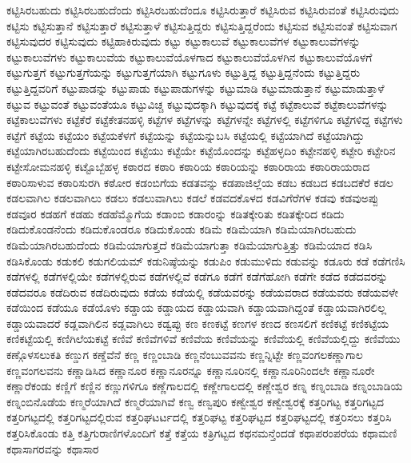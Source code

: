 {ಕಟ್ಟಿಸಿರಬಹುದು
ಕಟ್ಟಿಸಿರಬಹುದೆಂದು
ಕಟ್ಟಿಸಿರಬಹುದೆಂದೂ
ಕಟ್ಟಿಸಿರುತ್ತಾರೆ
ಕಟ್ಟಿಸಿರುವ
ಕಟ್ಟಿಸಿರುವಂತೆ
ಕಟ್ಟಿಸಿರುವುದು
ಕಟ್ಟಿಸು
ಕಟ್ಟಿಸುತ್ತಾನೆ
ಕಟ್ಟಿಸುತ್ತಾರೆ
ಕಟ್ಟಿಸುತ್ತಾಳೆ
ಕಟ್ಟಿಸುತ್ತಿದ್ದರು
ಕಟ್ಟಿಸುತ್ತಿದ್ದರೆಂದು
ಕಟ್ಟಿಸುವ
ಕಟ್ಟಿಸುವಂತೆ
ಕಟ್ಟಿಸುವಾಗ
ಕಟ್ಟಿಸುವುದರ
ಕಟ್ಟಿಸುವುದು
ಕಟ್ಟಿಹಾಕಿರುವುದು
ಕಟ್ಟು
ಕಟ್ಟುಕಾಲುವೆ
ಕಟ್ಟುಕಾಲುವೆಗಳ
ಕಟ್ಟುಕಾಲುವೆಗಳನ್ನು
ಕಟ್ಟುಕಾಲುವೆಗಳು
ಕಟ್ಟುಕಾಲುವೆಯ
ಕಟ್ಟುಕಾಲುವೆಯೊಳಗಾದ
ಕಟ್ಟುಕಾಲುವೆಯೊಳಗಿನ
ಕಟ್ಟುಕಾಲುವೆಯೊಳಗೆ
ಕಟ್ಟುಗುತ್ತಗೆ
ಕಟ್ಟುಗುತ್ತಗೆಯನ್ನು
ಕಟ್ಟುಗುತ್ತಗೆಯಾಗಿ
ಕಟ್ಟುಗೂಳು
ಕಟ್ಟುತ್ತಿದ್ದ
ಕಟ್ಟುತ್ತಿದ್ದನೆಂದು
ಕಟ್ಟುತ್ತಿದ್ದರು
ಕಟ್ಟುತ್ತಿದ್ದವರಿಗೆ
ಕಟ್ಟುಪಾಡನ್ನು
ಕಟ್ಟುಪಾಡು
ಕಟ್ಟುಪಾಡುಗಳನ್ನು
ಕಟ್ಟುಮಾಡಿ
ಕಟ್ಟುಮಾಡುತ್ತಾನೆ
ಕಟ್ಟುಮಾಡುತ್ತಾಳೆ
ಕಟ್ಟುವ
ಕಟ್ಟುವಂತೆ
ಕಟ್ಟುವಂತೆಯೂ
ಕಟ್ಟುವಿಚ್ಚ
ಕಟ್ಟುವುದಕ್ಕಾಗಿ
ಕಟ್ಟುವುದಕ್ಕೆ
ಕಟ್ಟೆ
ಕಟ್ಟೆಕಾಲುವೆ
ಕಟ್ಟೆಕಾಲುವೆಗಳನ್ನು
ಕಟ್ಟೆಕಾಲುವೆಗಳು
ಕಟ್ಟೆಕೆರೆ
ಕಟ್ಟೆಕೇತನಹಳ್ಳಿ
ಕಟ್ಟೆಗಳ
ಕಟ್ಟೆಗಳನ್ನು
ಕಟ್ಟೆಗಳನ್ನೇ
ಕಟ್ಟೆಗಳಲ್ಲಿ
ಕಟ್ಟೆಗಳಿಗೂ
ಕಟ್ಟೆಗಳಿದ್ದ
ಕಟ್ಟೆಗಳು
ಕಟ್ಟೆಗೆ
ಕಟ್ಟೆಯ
ಕಟ್ಟೆಯಂ
ಕಟ್ಟೆಯಕೆಳಗೆ
ಕಟ್ಟೆಯನ್ನು
ಕಟ್ಟೆಯನ್ನುಬಸಿ
ಕಟ್ಟೆಯಲ್ಲಿ
ಕಟ್ಟೆಯಾಗಿದೆ
ಕಟ್ಟೆಯಾಗಿದ್ದು
ಕಟ್ಟೆಯಾಗಿರಬಹುದೆಂದು
ಕಟ್ಟೆಯಿಂದ
ಕಟ್ಟೆಯು
ಕಟ್ಟೆಯೇ
ಕಟ್ಟೆಯೊಂದನ್ನು
ಕಟ್ಟೆಹಳ್ಳದಿಂ
ಕಟ್ಟೇನಹಳ್ಳಿ
ಕಟ್ಟೇರಿ
ಕಟ್ಟೇರಿನ
ಕಟ್ಟೇಸೋಮನಹಳ್ಳಿ
ಕಟ್ಟೊಬ್ಬೆಹಳ್ಳ
ಕಠಾರದ
ಕಠಾರಿ
ಕಠಾರಿಯ
ಕಠಾರಿಯನ್ನು
ಕಠಾರಿರಾಯ
ಕಠಾರಿರಾಯರಾದ
ಕಠಾರಿಸಾಳುವ
ಕಠಾರಿಸುರಗಿ
ಕಠೋರ
ಕಡಂಬಿಗೆಯ
ಕಡತವನ್ನು
ಕಡಪಾಜಿಲ್ಲೆಯ
ಕಡಬ
ಕಡಬದ
ಕಡಬದಕೆರೆ
ಕಡಲ
ಕಡಲವಾಗಿಲ
ಕಡಲವಾಗಿಲು
ಕಡಲು
ಕಡಲುವಾಗಿಲು
ಕಡಲೆ
ಕಡವದಕೊಳದ
ಕಡವಿಗೆರೆಗಳ
ಕಡವು
ಕಡವುಅಪ್ಪು
ಕಡವೂರ
ಕಡಹಗೆ
ಕಡಹು
ಕಡಹೆಮ್ಮೊಗೆಯ
ಕಡಾಂಬಿ
ಕಡಾರಂನ್ನು
ಕಡಿತಕ್ಕೇರಿತು
ಕಡಿತಕ್ಕೇರಿದ
ಕಡಿದು
ಕಡಿದುಕೊಂಡನೆಂದು
ಕಡಿದುಕೊಂಡರೂ
ಕಡಿದುಕೊಂಡು
ಕಡಿಮೆ
ಕಡಿಮೆಯಾಗಿ
ಕಡಿಮೆಯಾಗಿರಬಹುದು
ಕಡಿಮೆಯಾಗಿರಬಹುದೆಂದು
ಕಡಿಮೆಯಾಗುತ್ತದೆ
ಕಡಿಮೆಯಾಗುತ್ತಾ
ಕಡಿಮೆಯಾಗುತ್ತಿತ್ತು
ಕಡಿಮೆಯಾದ
ಕಡಿಸಿ
ಕಡಿಸಿಕೊಂಡು
ಕಡುಕಲಿ
ಕಡುಗಲಿಯಮ್
ಕಡುನಿಷ್ಠೆಯನ್ನು
ಕಡುಪಿಂ
ಕಡುಮುಳಿದು
ಕಡುವನ್ನು
ಕಡೂರು
ಕಡೆ
ಕಡೆಗಣಿಸಿ
ಕಡೆಗಳಲ್ಲಿ
ಕಡೆಗಳಲ್ಲಿಯೇ
ಕಡೆಗಳಲ್ಲಿರುವ
ಕಡೆಗಳಲ್ಲಿವೆ
ಕಡೆಗೂ
ಕಡೆಗೆ
ಕಡೆಗೆಹೋಗಿ
ಕಡೆಗೇ
ಕಡೆದ
ಕಡೆದವರನ್ನು
ಕಡೆದವರೂ
ಕಡೆದಿರುವ
ಕಡೆದಿರುವುದು
ಕಡೆಯ
ಕಡೆಯಲ್ಲಿ
ಕಡೆಯವರನ್ನು
ಕಡೆಯವರಾದ
ಕಡೆಯವರು
ಕಡೆಯವಳೇ
ಕಡೆಯಿಂದ
ಕಡೆಯೂ
ಕಡೆಯೊಳು
ಕಡ್ಡಾಯ
ಕಡ್ಡಾಯದ
ಕಡ್ಡಾಯವಾಗಿ
ಕಡ್ಡಾಯವಾಗಿದ್ದಂತೆ
ಕಡ್ಡಾಯವಾಗಿರಲಿಲ್ಲ
ಕಡ್ಡಾಯವಾದರೆ
ಕಡ್ಲವಾಗಿಲಿನ
ಕಡ್ಲವಾಗಿಲು
ಕಡ್ವಪ್ಪು
ಕಣ
ಕಣಕಟ್ಟೆ
ಕಣಗಳ
ಕಣದ
ಕಣಸಲಿಗೆ
ಕಣಿಕಟ್ಟೆ
ಕಣಿಕಟ್ಟೆಯ
ಕಣಿಕಟ್ಟೆಯಲ್ಲಿ
ಕಣಿಗಿಲೆಯಕಟ್ಟೆ
ಕಣಿವೆ
ಕಣಿವೆಗಳಿವೆ
ಕಣಿವೆಯ
ಕಣಿವೆಯನ್ನು
ಕಣಿವೆಯಲ್ಲಿ
ಕಣಿವೆಯಲ್ಲಿದ್ದು
ಕಣಿವೆಯು
ಕಣ್ಗೊಳಸಲುಕತಿ
ಕಣ್ಡುಗ
ಕಣ್ಡೆವೆನೆ
ಕಣ್ಣ
ಕಣ್ಣಂಬಾಡಿ
ಕಣ್ಣನೆಂಬುವವನು
ಕಣ್ಣನ್ನಿಟ್ಟೇ
ಕಣ್ಣವಂಗಲಕಣ್ಣಾಗಾಲ
ಕಣ್ಣವಂಗಲವನು
ಕಣ್ಣಾಡಿಸಿದ
ಕಣ್ಣಾನೂರ
ಕಣ್ಣಾನೂರನ್ನೂ
ಕಣ್ಣಾನೂರಿನಲ್ಲಿ
ಕಣ್ಣಾನೂರಿನಿಂದಲೇ
ಕಣ್ಣಾನೂರೇ
ಕಣ್ಣಾರೆಕಂಡು
ಕಣ್ಣಿಗೆ
ಕಣ್ಣಿನ
ಕಣ್ಣುಗಳಿಗೂ
ಕಣ್ಣೆಗಾಲದಲ್ಲಿ
ಕಣ್ಣೇಗಾಲದಲ್ಲಿ
ಕಣ್ಣೇಶ್ವರ
ಕಣ್ನ
ಕಣ್ನಂಬಾಡಿ
ಕಣ್ನಂಬಾಡಿಯ
ಕಣ್ನಂಬಿನೊಡೆಯ
ಕಣ್ಮರೆಯಾಗಿದೆ
ಕಣ್ಮರೆಯಾಗಿವೆ
ಕಣ್ವ
ಕಣ್ವಪುರಿ
ಕಣ್ವೇಶ್ವರ
ಕಣ್ವೇಶ್ವರಕ್ಕೆ
ಕತ್ತರಿಗಟ್ಟ
ಕತ್ತರಿಗಟ್ಟದ
ಕತ್ತರಿಗಟ್ಟದಲ್ಲಿ
ಕತ್ತರಿಗಟ್ಟದಲ್ಲಿರುವ
ಕತ್ತರಿಘಟರ್ಟದಲ್ಲಿ
ಕತ್ತರಿಘಟ್ಟ
ಕತ್ತರಿಘಟ್ಟದ
ಕತ್ತರಿಘಟ್ಟದಲ್ಲಿ
ಕತ್ತರಿಸಲು
ಕತ್ತರಿಸಿ
ಕತ್ತರಿಸಿಕೊಂಡು
ಕತ್ತಿ
ಕತ್ತಿಗುರಾಣಿಗಳೊಂದಿಗೆ
ಕತ್ತೆ
ಕತ್ತೆಯ
ಕತ್ರಿಗಟ್ಟದ
ಕಥನಮನ್ತೆಂದಡೆ
ಕಥಾಪರಂಪರೆಯ
ಕಥಾಮಣಿ
ಕಥಾಸಾಗರವನ್ನು
ಕಥಾಸಾರ
}
